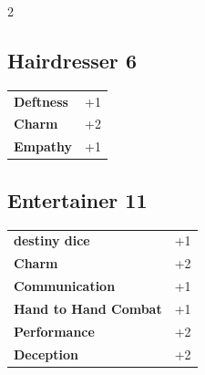 \begin{multicols}{2}
\begin{tcolorbox}

\end{tcolorbox}

\begin{tcolorbox}
    \subsection*{Hairdresser \hfill \small{6 }}
    \tcblower




\begin{tabular}{@{}ll@{}}
    \textbf{Deftness} & +1\\
    \textbf{Charm} & +2\\
    \textbf{Empathy} & +1\\
\end{tabular}


\end{tcolorbox}

\begin{tcolorbox}
    \subsection*{Entertainer \hfill \small{11 }}
    \tcblower




\begin{tabular}{@{}ll@{}}
    \textbf{destiny dice} & +1\\
    \textbf{Charm} & +2\\
    \textbf{Communication} & +1\\
    \textbf{Hand to Hand Combat} & +1\\
    \textbf{Performance} & +2\\
    \textbf{Deception} & +2\\
\end{tabular}


\end{tcolorbox}
\end{multicols}
